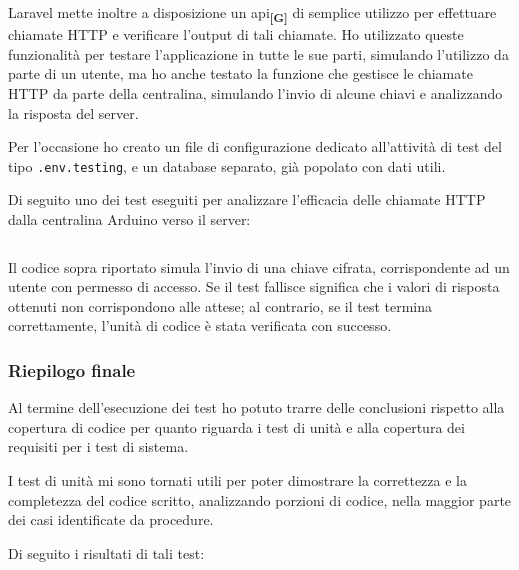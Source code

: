 Laravel mette inoltre a disposizione un \gls{api}\textbf{\textsubscript{[G]}} di semplice utilizzo per effettuare chiamate HTTP e verificare l'output di tali chiamate. Ho utilizzato queste funzionalità per testare l'applicazione in tutte le sue parti, simulando l'utilizzo da parte di un utente, ma ho anche testato la funzione che gestisce le chiamate HTTP da parte della centralina, simulando l'invio di alcune chiavi e analizzando la risposta del server.

\medskip

Per l'occasione ho creato un file di configurazione dedicato all'attività di test del tipo \verb|.env.testing|, e un database separato, già popolato con dati utili.

\medskip

Di seguito uno dei test eseguiti per analizzare l'efficacia delle chiamate HTTP dalla centralina Arduino verso il server:

\inputminted[bgcolor=bg, frame=lines, framesep=2mm, startinline=true, breaklines=true, fontsize=\small, linenos=true]{php}{capitoli/code.php}

Il codice sopra riportato simula l'invio di una chiave cifrata, corrispondente ad un utente con permesso di accesso. Se il test fallisce significa che i valori di risposta ottenuti non corrispondono alle attese; al contrario, se il test termina correttamente, l'unità di codice è stata verificata con successo.

\subsubsection{Riepilogo finale}
Al termine dell'esecuzione dei test ho potuto trarre delle conclusioni rispetto alla copertura di codice per quanto riguarda i test di unità e alla copertura dei requisiti per i test di sistema.

\medskip

I test di unità mi sono tornati utili per poter dimostrare la correttezza e la completezza del codice scritto, analizzando porzioni di codice, nella maggior parte dei casi identificate da procedure. 

Di seguito i risultati di tali test:

